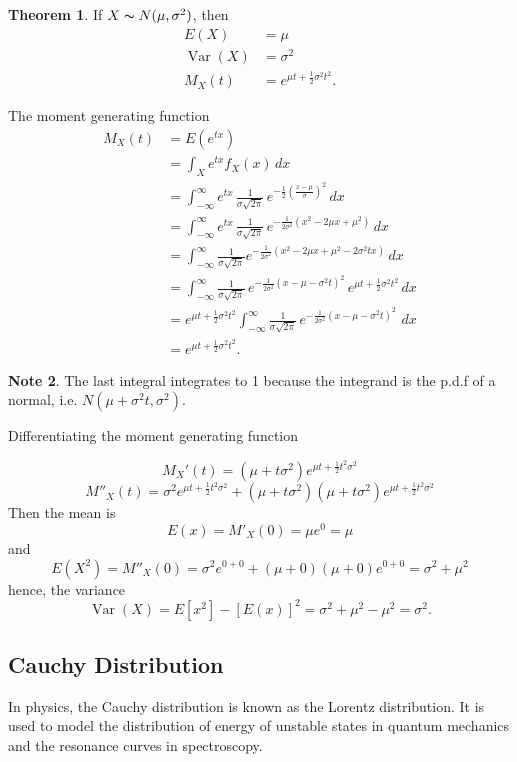 \documentclass[12pt,a4paper]{report}
\theoremstyle{definition}
\newtheorem{thm}{Theorem}[section]
\newtheorem{note}[thm]{Note}
\theoremstyle{plain}
\theoremstyle{definition}
\begin{document}
\begin{thm}
If $X \thicksim N(\mu,\sigma^2)$, then
\begin{align*}
E(X) & = \mu\\
\operatorname{Var}(X) & = \sigma^2\\
M_X(t) & = e^{\mu t + \frac{1}{2}\sigma^2 t^2}.
\end{align*}
\end{thm}
The moment generating function
\begin{align*}
M_X(t) & = E(e^{tx})\\
& =\int_X e^{tx}f_X(x)\, dx\\
& = \int^{\infty}_{-\infty} e^{tx}\, \frac{1}{\sigma\sqrt{2\pi}}\, e^{-\frac{1}{2}\left(\frac{x-\mu}{\sigma}\right)^2}\, dx\\
& = \int^{\infty}_{-\infty} e^{tx}\, \frac{1}{\sigma \sqrt{2\pi}}\, e^{-\frac{1}{2\sigma^2}\left(x^2 - 2\mu x + \mu^2\right)}\, dx\\
& = \int^{\infty}_{-\infty}\frac{1}{\sigma\sqrt{2\pi}}e^{-\frac{1}{2\sigma^2}\left(x^2 - 2\mu x + \mu^2 - 2\sigma^2 tx\right)}\, dx\\
& = \int^{\infty}_{-\infty}\frac{1}{\sigma\sqrt{2\pi}}\, e^{-\frac{1}{2\sigma^2}\left(x - \mu - \sigma^2t\right)^2}\, e^{\mu t + \frac{1}{2}\sigma^2 t^2}\, dx\\
& = e^{\mu t + \frac{1}{2}\sigma^2 t^2} \int^{\infty}_{-\infty}\frac{1}{\sigma\sqrt{2\pi}}\, e^{-\frac{1}{2\sigma^2}\left(x - \mu - \sigma^2t\right)^2}\, \, dx\\
& = e^{\mu t + \frac{1}{2}\sigma^2 t^2}.
\end{align*}

\begin{note}
The last integral integrates to 1 because the integrand is the p.d.f of a normal,
i.e. $N(\mu + \sigma^2 t, \sigma^2)$.
\end{note}


Differentiating the moment generating function

\[M_X'(t)=(\mu +t\sigma^2) e^{\mu t+\frac{1}{2}t^2\sigma^2}\]
\[M''_X(t) = \sigma^2e^{\mu t+\frac{1}{2}t^2\sigma^2}+(\mu +t\sigma^2)(\mu +t\sigma^2)e^{\mu t +\frac{1}{2}t^2\sigma^2}\]
Then the mean is
\[E(x)=M'_X(0)=\mu e^0=\mu\]
and
\[E(X^2)= M''_X(0) =\sigma^2e^{0+0}+(\mu +0)(\mu +0)e^{0+0}=\sigma^2+\mu^2\]
hence, the variance
\[\operatorname{Var}(X)=E[x^2]-[E(x)]^2=\sigma^2+\mu^2-\mu^2=\sigma^2.\]






\subsection{Cauchy Distribution}
\vspace{-15pt}
In physics, the Cauchy distribution is known as the Lorentz distribution. It is used to model the distribution of energy of unstable states in quantum mechanics and the resonance curves in spectroscopy.
\end{document}
